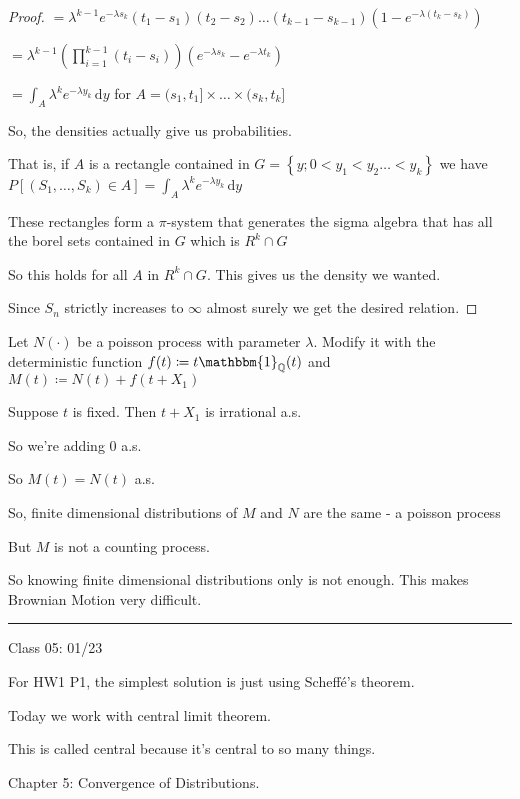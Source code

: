 \documentclass{article}
\theoremstyle{definition}
\begin{document}
\begin{proof}
    \(=\lambda^{k-1} e^{-\lambda s_k}(t_1 - s_1)(t_2 -s_2)\dots (t_{k-1} - s_{k-1})(1-e^{-\lambda (t_k - s_k)}) \) 

    \(=\lambda^{k-1}(\prod_{i=1}^{k-1} (t_i - s_i ))(e^{-\lambda s_k}-e^{-\lambda t_k})\) 

    \(=\displaystyle \int_{A}^{} \lambda ^k e^{-\lambda y_k} \,\mathrm{d}y \) for \(A=(s_1,t_1]\times \dots \times (s_k,t_k]\) 

    So, the densities actually give us probabilities.

    That is, if \(A\) is a rectangle contained in \(G=\left\{ y; 0 < y_1 < y_2 \dots < y_k \right\} \) we have \(P[(S_1 , \dots , S_k)\in A]= \displaystyle \int_A \lambda ^k e^{-\lambda y_k} \, \mathrm{d}y \) 

    These rectangles form a \(\pi\)-system that generates the sigma algebra that has all the borel sets contained in \(G\) which is \(R^k\cap G\)

    So this holds for all \(A\) in \(R^k\cap G \). This gives us the density we wanted.
    
    Since \(S_n\) strictly increases to \(\infty \) almost surely we get the desired relation.

\end{proof}

Let \(N(\cdot)\) be a poisson process with parameter \(\lambda\). Modify it with the deterministic function \(f(t)\coloneqq t \mathbbm{1}_{\mathbb{Q} }(t)\) and \(M(t)\coloneqq N(t)+f(t+X_1)\) 

Suppose \(t\) is fixed. Then \(t+X_1\) is irrational a.s.

So we're adding \(0\) a.s.

So \(M(t)=N(t)\) a.s.

So, finite dimensional distributions of \(M\) and \(N\) are the same - a poisson process

But \(M\) is not a counting process.

So knowing finite dimensional distributions only is not enough. This makes Brownian Motion very difficult.

\hfil
\hrule

Class 05: 01/23

For HW1 P1, the simplest solution is just using Scheff\'e's theorem.

Today we work with central limit theorem.

This is called central because it's central to so many things.

Chapter 5: Convergence of Distributions.
\end{document}
